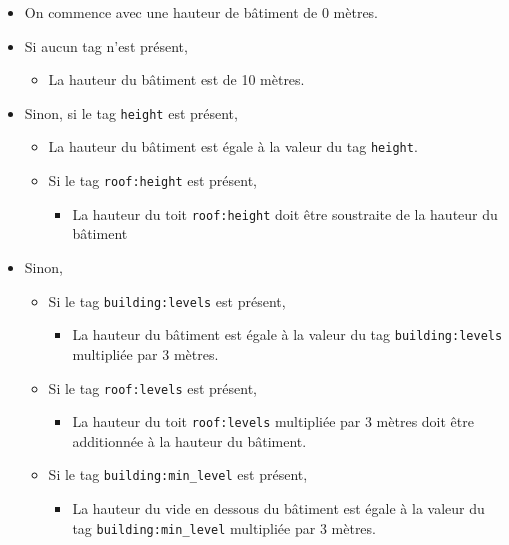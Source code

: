 \begin{itemize}
    \item On commence avec une hauteur de bâtiment de 0 mètres.
    \item Si aucun tag n'est présent,
          \begin{itemize}
              \item La hauteur du bâtiment est de 10 mètres.
          \end{itemize}
    \item Sinon, si le tag \texttt{height} est présent,
          \begin{itemize}
              \item La hauteur du bâtiment est égale à la valeur du tag \texttt{height}.
              \item Si le tag \texttt{roof:height} est présent,
                    \begin{itemize}
                        \item La hauteur du toit \texttt{roof:height} doit être soustraite de la hauteur du bâtiment
                    \end{itemize}
          \end{itemize}
    \item Sinon,
          \begin{itemize}
              \item Si le tag \texttt{building:levels} est présent,
                    \begin{itemize}
                        \item La hauteur du bâtiment est égale à la valeur du tag \texttt{building:levels} multipliée par 3 mètres.
                    \end{itemize}
              \item Si le tag \texttt{roof:levels} est présent,
                    \begin{itemize}
                        \item La hauteur du toit \texttt{roof:levels} multipliée par 3 mètres doit être additionnée à la hauteur du bâtiment.
                    \end{itemize}
              \item Si le tag \texttt{building:min\_level} est présent,
                    \begin{itemize}
                        \item La hauteur du vide en dessous du bâtiment est égale à la valeur du tag \texttt{building:min\_level} multipliée par 3 mètres.
                    \end{itemize}
          \end{itemize}
\end{itemize}

